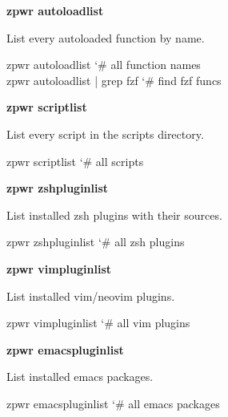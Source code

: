 \documentclass[11pt,a4paper,twoside]{book}
\begin{document}
\vspace{12pt}
{\bfseries\color{neonyellow} zpwr autoloadlist}\vspace{4pt}

List every autoloaded function by name.

\begin{codebox}
\color{neongreen}zpwr autoloadlist            {\char`\#} all function names\\
\color{neongreen}zpwr autoloadlist | grep fzf {\char`\#} find fzf funcs\\
\end{codebox}


\vspace{12pt}
{\bfseries\color{neonyellow} zpwr scriptlist}\vspace{4pt}

List every script in the scripts directory.

\begin{codebox}
\color{neongreen}zpwr scriptlist              {\char`\#} all scripts\\
\end{codebox}


\vspace{12pt}
{\bfseries\color{neonyellow} zpwr zshpluginlist}\vspace{4pt}

List installed zsh plugins with their sources.

\begin{codebox}
\color{neongreen}zpwr zshpluginlist           {\char`\#} all zsh plugins\\
\end{codebox}


\vspace{12pt}
{\bfseries\color{neonyellow} zpwr vimpluginlist}\vspace{4pt}

List installed vim/neovim plugins.

\begin{codebox}
\color{neongreen}zpwr vimpluginlist           {\char`\#} all vim plugins\\
\end{codebox}


\vspace{12pt}
{\bfseries\color{neonyellow} zpwr emacspluginlist}\vspace{4pt}

List installed emacs packages.

\begin{codebox}
\color{neongreen}zpwr emacspluginlist         {\char`\#} all emacs packages\\
\end{codebox}
\end{document}
